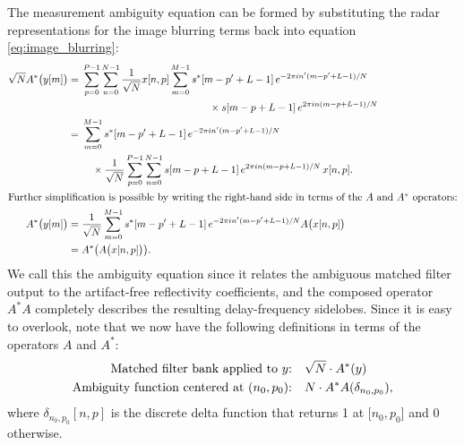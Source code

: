 The measurement ambiguity equation can be formed by substituting the radar representations for the image blurring terms back into equation \eqref{eq:image_blurring}:
\begin{align}
 \sqrt{N} A^*\paren[\big]{y[m]}
 &= \begin{multlined}[t]
     \sum_{p=0}^{P-1} \sum_{n=0}^{N-1} \frac{1}{\sqrt{N}} x[n,p] \sum_{m=0}^{M-1} s^*[m - p' + L - 1]\, e^{-2\pi i n' (m-p'+L-1)/N}\\
     \times s[m - p + L - 1]\, e^{2\pi i n (m-p+L-1)/N}
    \end{multlined}\nonumber\\
 &= \begin{multlined}[t]
     \sum_{m=0}^{M-1} s^*[m - p' + L - 1]\, e^{-2\pi i n' (m-p'+L-1)/N}\\
     \times \frac{1}{\sqrt{N}} \sum_{p=0}^{P-1} \sum_{n=0}^{N-1} s[m - p + L - 1]\, e^{2\pi i n (m-p+L-1)/N}\, x[n,p].
    \end{multlined}\\
\intertext{Further simplification is possible by writing the right-hand side in terms of the $A$ and $A^*$ operators:}
 A^*\paren[\big]{y[m]}
 &= \frac{1}{\sqrt{N}} \sum_{m=0}^{M-1} s^*[m - p' + L - 1]\, e^{-2\pi i n' (m-p'+L-1)/N} A\paren[\big]{x[n,p]}\nonumber\\
 &= A^*\paren*{A\paren[\big]{x[n,p]}}.
\end{align}
We call this the ambiguity equation since it relates the ambiguous matched filter output to the artifact-free reflectivity coefficients, and the composed operator $A^*A$ completely describes the resulting delay-frequency sidelobes. Since it is easy to overlook, note that we now have the following definitions in terms of the operators $A$ and $A^*$:
\begin{align}
 \text{Matched filter bank applied to $y$:} \quad & \sqrt{N} \cdot A^*\paren{y}\label{eq:mf_Astar}\\
 \text{Ambiguity function centered at ($n_0 , p_0$):} \quad & N \cdot A^*A\paren*{\delta_{n_0,p_0}}\label{eq:ambiguity_AstarA},
\end{align}
where $\delta_{n_0,p_0}[n,p]$ is the discrete delta function that returns 1 at [$n_0 , p_0$] and 0 otherwise.

